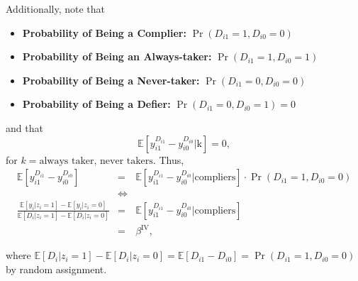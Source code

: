 \noindent Additionally, note that 
\begin{itemize} 
\item \textbf{Probability of Being a Complier:} $\Pr \left( D_{i1} = 1, D_{i0} = 0 \right)$
\item \textbf{Probability of Being an Always-taker:} $\Pr \left( D_{i1} = 1, D_{i0} = 1 \right)$
\item \textbf{Probability of Being a Never-taker:} $\Pr \left( D_{i1} = 0, D_{i0} = 0 \right)$
\item \textbf{Probability of Being a Defier:} $\Pr \left( D_{i1} = 0, D_{i0} = 1 \right) = 0$
\end{itemize} 
\noindent and that 
\begin{equation}
\mathbb{E} \left[ y_{i1}^{D_{i1}} - y_{i0}^{D_{i0}} |  \text{k} \right] = 0, 
\end{equation}
\noindent for $k = \text{always taker, never takers}$. Thus, 
\begin{eqnarray} 
\mathbb{E} \left[ y_{i1}^{D_{i1}} - y_{i0}^{D_{i0}} \right] &=& \mathbb{E} \left[ y_{i1}^{D_{i1}} - y_{i0}^{D_{i0}}  | \text{compliers} \right] \cdot \Pr \left( D_{i1} = 1, D_{i0} = 0 \right) \nonumber \\ 
&\Leftrightarrow& \nonumber \\ 
\frac{\mathbb{E} \left[ y_{i} | z_{i} = 1 \right] - \mathbb{E} \left[ y_{i} | z_{i} = 0 \right]}{ \mathbb{E} \left[ D_{i} | z_{i}  = 1 \right] - \mathbb{E} \left[ D_{i} | z_{i}  = 0 \right] } &=&  \mathbb{E} \left[ y_{i1}^{D_{i1}} - y_{i0}^{D_{i0}}  | \text{compliers} \right] \nonumber \\ 
&=& \beta^{\text{IV}}, 
\end{eqnarray}

\noindent where $\mathbb{E} \left[ D_{i} | z_{i} = 1 \right] - \mathbb{E} \left[ D_{i} | z_{i} = 0 \right] = \mathbb{E} \left[ D_{i1} - D_{i0} \right] = \Pr \left( D_{i1} = 1, D_{i0} = 0 \right)$ by random assignment.\\

